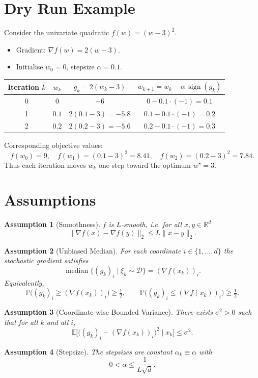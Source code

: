 \documentclass[11pt]{article}
\newtheorem{assumption}{Assumption}
\newcommand{\sign}{\operatorname{sign}}
\newcommand{\R}{\mathbb{R}}
\begin{document}
\section*{Dry Run Example}
Consider the univariate quadratic $f(w)=(w-3)^2$.
\begin{itemize}
    \item Gradient: $\nabla f(w)=2(w-3)$.
    \item Initialise $w_0=0$, stepsize $\alpha=0.1$.
\end{itemize}
\begin{center}
\begin{tabular}{c|c|c|c}
Iteration $k$ & $w_k$ & $g_k=2(w_k-3)$ & $w_{k+1}=w_k-\alpha\,\sign(g_k)$\\\hline
0 & $0$ & $-6$ & $0-0.1\cdot(-1)=0.1$\\
1 & $0.1$ & $2(0.1-3)=-5.8$ & $0.1-0.1\cdot(-1)=0.2$\\
2 & $0.2$ & $2(0.2-3)=-5.6$ & $0.2-0.1\cdot(-1)=0.3$\\
\end{tabular}
\end{center}
Corresponding objective values:
\[
f(w_0)=9,\quad f(w_1)=(0.1-3)^2=8.41,\quad f(w_2)=(0.2-3)^2=7.84.
\]
Thus each iteration moves $w_k$ one step toward the optimum $w^\star=3$.

\newpage
\section*{Assumptions}
\begin{assumption}[Smoothness]\label{ass:smooth}
$f$ is $L$‑smooth, i.e. for all $x,y\in\R^{d}$
\[
\|\nabla f(x)-\nabla f(y)\|_2\le L\|x-y\|_2 .
\]
\end{assumption}
\begin{assumption}[Unbiased Median]\label{ass:median}
For each coordinate $i\in\{1,\dots,d\}$ the stochastic gradient satisfies
\[
\operatorname{median}\bigl\{ (g_k)_i \mid \xi_k\sim\mathcal{D}\bigr\}= (\nabla f(x_k))_i .
\]
Equivalently,
\[
\mathbb{P}\bigl((g_k)_i\ge (\nabla f(x_k))_i\bigr)\ge \tfrac12,\qquad
\mathbb{P}\bigl((g_k)_i\le (\nabla f(x_k))_i\bigr)\ge \tfrac12 .
\]
\end{assumption}
\begin{assumption}[Coordinate‑wise Bounded Variance]\label{ass:var}
There exists $\sigma^2>0$ such that for all $k$ and all $i$,
\[
\mathbb{E}\bigl[ \bigl((g_k)_i-(\nabla f(x_k))_i\bigr)^2 \mid x_k\bigr]\le\sigma^2 .
\]
\end{assumption}
\begin{assumption}[Stepsize]\label{ass:stepsize}
The stepsizes are constant $\alpha_k\equiv\alpha$ with
\[
0<\alpha\le\frac{1}{L\sqrt{d}} .
\]
\end{assumption}
\end{document}
